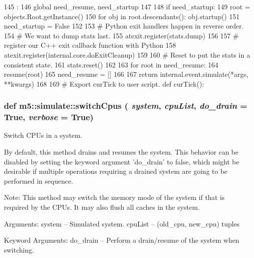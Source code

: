 \begin{DoxyCode}
145                              :
146     global need_resume, need_startup
147 
148     if need_startup:
149         root = objects.Root.getInstance()
150         for obj in root.descendants(): obj.startup()
151         need_startup = False
152 
153         # Python exit handlers happen in reverse order.
154         # We want to dump stats last.
155         atexit.register(stats.dump)
156 
157         # register our C++ exit callback function with Python
158         atexit.register(internal.core.doExitCleanup)
159 
160         # Reset to put the stats in a consistent state.
161         stats.reset()
162 
163     for root in need_resume:
164         resume(root)
165     need_resume = []
166 
167     return internal.event.simulate(*args, **kwargs)
168 
169 # Export curTick to user script.
def curTick():
\end{DoxyCode}
\hypertarget{namespacem5_1_1simulate_a962abc699043c45d6c8c3057469e1aec}{
\subsubsection[{switchCpus}]{\setlength{\rightskip}{0pt plus 5cm}def m5::simulate::switchCpus ( {\em system}, \/   {\em cpuList}, \/   {\em do\_\-drain} = {\ttfamily True}, \/   {\em verbose} = {\ttfamily True})}}
\label{namespacem5_1_1simulate_a962abc699043c45d6c8c3057469e1aec}
\begin{DoxyVerb}Switch CPUs in a system.

By default, this method drains and resumes the system. This
behavior can be disabled by setting the keyword argument
'do_drain' to false, which might be desirable if multiple
operations requiring a drained system are going to be performed in
sequence.

Note: This method may switch the memory mode of the system if that
is required by the CPUs. It may also flush all caches in the
system.

Arguments:
  system -- Simulated system.
  cpuList -- (old_cpu, new_cpu) tuples

Keyword Arguments:
  do_drain -- Perform a drain/resume of the system when switching.
\end{DoxyVerb}
 



